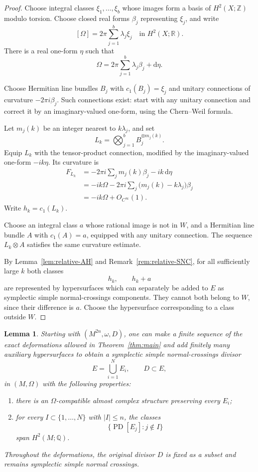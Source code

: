 \documentclass[11pt]{article}
\newtheorem{lemma}[theorem]{Lemma}
\theoremstyle{definition}
\theoremstyle{remark}
\newcommand{\R}{\mathbb R}
\newcommand{\Q}{\mathbb Q}
\newcommand{\Z}{\mathbb Z}
\newcommand{\dd}{\mathrm d}
\newcommand{\PD}{\operatorname{PD}}
\begin{document}
\begin{proof}
Choose integral classes $\xi_1,\ldots,\xi_b$ whose images form a
basis of $H^2(X;\Z)$ modulo torsion.  Choose closed real forms
$\beta_j$ representing $\xi_j$, and write
\[
[\Omega]=2\pi\sum_{j=1}^{b}\lambda_j\xi_j
\quad\text{in }H^2(X;\R).
\]
There is a real one-form $\eta$ such that
\[
\Omega=2\pi\sum_{j=1}^{b}\lambda_j\beta_j+\dd\eta.
\]

Choose Hermitian line bundles $B_j$ with $c_1(B_j)=\xi_j$ and
unitary connections of curvature $-2\pi i\beta_j$.
Such connections exist: start with any unitary connection and
correct it by an imaginary-valued one-form, using the
Chern--Weil formula.

Let $m_j(k)$ be an integer nearest to $k\lambda_j$, and set
\[
L_k=\bigotimes_{j=1}^{b}B_j^{\otimes m_j(k)}.
\]
Equip $L_k$ with the tensor-product connection, modified by
the imaginary-valued one-form $-ik\eta$.  Its curvature is
\begin{align*}
F_{L_k}
&=-2\pi i\sum_j m_j(k)\beta_j-ik\,\dd\eta\\
&=-ik\Omega
  -2\pi i\sum_j\bigl(m_j(k)-k\lambda_j\bigr)\beta_j\\
&=-ik\Omega+O_{C^\infty}(1).
\end{align*}
Write $h_k=c_1(L_k)$.

Choose an integral class $a$ whose rational image is not in $W$,
and a Hermitian line bundle $A$ with $c_1(A)=a$, equipped with
any unitary connection.  The sequence $L_k\otimes A$ satisfies
the same curvature estimate.

By Lemma~\ref{lem:relative-AH} and
Remark~\ref{rem:relative-SNC}, for all sufficiently large $k$
both classes
\[
h_k,\qquad h_k+a
\]
are represented by hypersurfaces which can separately be added
to $E$ as symplectic simple normal-crossings components.
They cannot both belong to $W$, since their difference is $a$.
Choose the hypersurface corresponding to a class outside $W$.
\end{proof}

\begin{lemma}\label{lem:redundant-enlargement}
Starting with $(M^{2n},\omega,D)$, one can make a finite sequence
of the exact deformations allowed in Theorem~\ref{thm:main} and
add finitely many auxiliary hypersurfaces to obtain a symplectic
simple normal-crossings divisor
\[
E=\bigcup_{i=1}^{N}E_i,\qquad D\subset E,
\]
in $(M,\Omega)$ with the following properties:
\begin{enumerate}[label=\textup{(\alph*)}]
\item there is an $\Omega$-compatible almost complex structure
      preserving every $E_i$;
\item for every $I\subset\{1,\ldots,N\}$ with $|I|\leq n$,
      the classes
      \[
      \{\PD[E_j]:j\notin I\}
      \]
      span $H^2(M;\Q)$.
\end{enumerate}
Throughout the deformations, the original divisor $D$ is fixed
as a subset and remains symplectic simple normal crossings.
\end{lemma}
\end{document}
